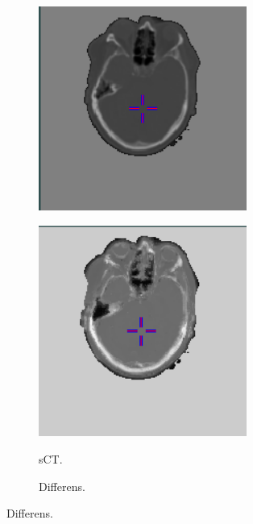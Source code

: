 \begin{figure}
\begin{subfigure}[b]{0.3\textwidth}
        \includegraphics[width=0.75\textwidth]{colager/loocv_ct/loocv_010850_ct.png}
        \label{col:loocv_ct_pat3_ct}
    \end{subfigure}\hfill
    \begin{subfigure}[b]{0.3\textwidth}
        \caption{sCT.}
        \includegraphics[width=0.75\textwidth]{colager/loocv_ct/loocv_010850_sct.png}
        \label{col:loocv_ct_pat3_sct}
    \end{subfigure}\hfill
    \begin{subfigure}[b]{0.3\textwidth}
        \caption{Differens.}

\end{subfigure}
\end{figure}
